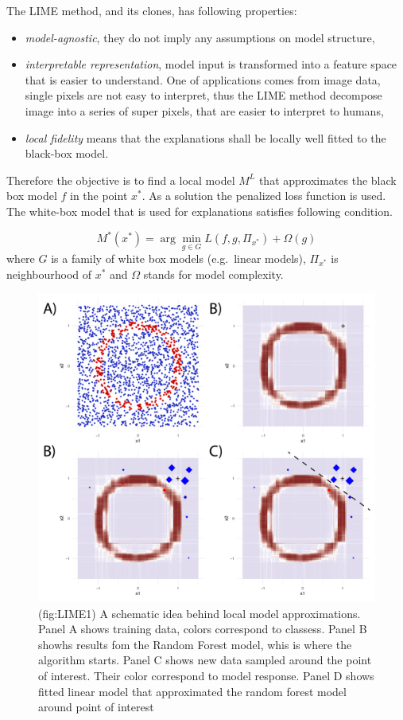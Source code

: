 \documentclass[]{krantz}
\providecommand{\tightlist}{%
  \setlength{\itemsep}{0pt}\setlength{\parskip}{0pt}}
\theoremstyle{definition}
\theoremstyle{definition}
\theoremstyle{definition}
\theoremstyle{remark}
\begin{document}
The LIME method, and its clones, has following properties:

\begin{itemize}
\tightlist
\item
  \emph{model-agnostic}, they do not imply any assumptions on model
  structure,
\item
  \emph{interpretable representation}, model input is transformed into a
  feature space that is easier to understand. One of applications comes
  from image data, single pixels are not easy to interpret, thus the
  LIME method decompose image into a series of super pixels, that are
  easier to interpret to humans,
\item
  \emph{local fidelity} means that the explanations shall be locally
  well fitted to the black-box model.
\end{itemize}

Therefore the objective is to find a local model \(M^L\) that
approximates the black box model \(f\) in the point \(x^*\). As a
solution the penalized loss function is used. The white-box model that
is used for explanations satisfies following condition.

\[
M^*(x^*) = \arg \min_{g \in G} L(f, g, \Pi_{x^*}) + \Omega (g) 
\] where \(G\) is a family of white box models (e.g.~linear models),
\(\Pi_{x^*}\) is neighbourhood of \(x^*\) and \(\Omega\) stands for
model complexity.

\begin{figure}

{\centering \includegraphics[width=0.7\linewidth]{figure/circle_4panels} 

}

\caption{(fig:LIME1) A schematic idea behind local model approximations. Panel A shows training data, colors correspond to classess. Panel B showhs results fom the Random Forest model, whis is where the algorithm starts. Panel C shows new data sampled around the point of interest. Their color correspond to model response. Panel D shows fitted linear model that approximated the random forest model around point of interest}\label{fig:LIME1}
\end{figure}
\end{document}
